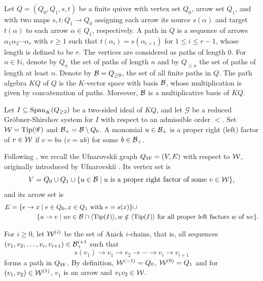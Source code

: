 \documentclass[10pt, reqno]{amsart}
\theoremstyle{definition}
\theoremstyle{remark}
\numberwithin{equation}{section}
\begin{document}
Let \(Q=(Q_0, Q_1, s, t)\) be a finite quiver with vertex set \(Q_0\), arrow set \(Q_1\), and with two maps \(s,t: Q_1 \rightarrow Q_0\) assigning each arrow its source \(s(\alpha)\) and  target \(t(\alpha)\) to  each arrow \( \alpha \in Q_1\), respectively. A path in \(Q\) is a sequence of arrows \(\alpha_1 \alpha_2 \cdots \alpha_r\) with \(r\ge 1\) such that \(t(\alpha _i)= s(\alpha_{i+1}) \) for \(1 \le i \le r-1\), whose  length is defined to be \(r\). The vertices are considered as paths of length $0$. For \(n \in \mathbb{N}\), denote by \(Q_n\) the set of paths of length \(n\) and by \(Q_{\ge n}\) the set of paths of length at least \(n\). Denote by \(\mathcal{B}= Q_{\ge 0}\),  the set of all finite paths in \(Q\). 
The path algebra \(KQ\) of \(Q\) is the \(K\)-vector space with  basis \(\mathcal{B}\), whose multiplication is given by concatenation of paths. Moreover, $\mathcal{B}$ is a multiplicative basis of  \(KQ\).

Let \(I\subseteq\mathrm{Span}_K(Q_{\ge2})\) be a two-sided ideal of \(KQ\), and let \(\mathscr{G}\) be a reduced Gr\"obner-Shirshov system for \(I\) with respect to an admissible order \(<\). Set \(\mathcal{W}=\mathrm{Tip}(\mathscr{G})\) and \(\mathcal{B}_+ =\mathcal{B}\setminus Q_0\). A monomial \(u\in \mathcal{B}_+\) is a proper right  (left) factor of \(v \in \mathcal{W}\) if \(v=bu\) (\(v=ub\)) for some \(b \in \mathcal{B}_+\).

Following \cite[Section 4]{CLZ24}, we recall the Ufnarovski\u{\i} graph  \(Q_{\mathcal{W}} = (V, E)\) with respect to \(\mathcal{W}\), originally introduced by Ufnarovski\u{\i} \cite{Ufn89}. Its vertex set is
\[V = Q_0 \cup Q_1 \cup \{ u \in \mathcal{B} \mid u \text{ is a proper right factor of some } v \in \mathcal{W} \},\]
and its arrow set is
\[\begin{aligned}
    E &= \{ e \to x \mid e \in Q_0, x  \in Q_1\  \text{with}\  e=s(x)\} \cup \\
& \quad \quad\quad\quad\{ u \to v  \mid uv \in \mathcal{B} \cap \langle \mathrm{Tip}(I) \rangle, w \notin \langle \mathrm{Tip}(I) \rangle \text{ for all proper left factors } w \text{ of } uv \}.
\end{aligned}
\]


For \(i \ge 0\), let \(\mathcal{W}^{(i)}\) be the set of Anick \(i\)-chains, that is, all sequences \((v_1, v_2, \dots, v_i, v_{i+1}) \in \mathcal{B}_+^{i+1} \)  such that 
\[
s(v_1) \to v_1 \to v_2 \to \cdots \to v_i \to v_{i+1}
\]
forms a path in \(Q_{\mathcal{W}}\). By definition, \(\mathcal{W}^{(-1)} = Q_0\), $\mathcal{W}^{(0)}=Q_1$ and  for $(v_1, v_2)\in \mathcal{W}^{(1)}$, $v_1$ is an arrow and $v_1v_2\in \mathcal{W}$.
\end{document}

